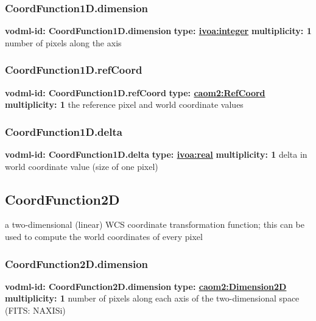     \subsubsection{CoordFunction1D.dimension}
      \textbf{vodml-id: CoordFunction1D.dimension} \newline
      \textbf{type: \hyperref[sect:ivoa]{ivoa:integer}} \newline
      \textbf{multiplicity: 1} \newline
      number of pixels along the axis

    \subsubsection{CoordFunction1D.refCoord}
      \textbf{vodml-id: CoordFunction1D.refCoord} \newline
      \textbf{type: \hyperref[sect:RefCoord]{caom2:RefCoord}} \newline
      \textbf{multiplicity: 1} \newline
      the reference pixel and world coordinate values

    \subsubsection{CoordFunction1D.delta}
      \textbf{vodml-id: CoordFunction1D.delta} \newline
      \textbf{type: \hyperref[sect:ivoa]{ivoa:real}} \newline
      \textbf{multiplicity: 1} \newline
      delta in world coordinate value (size of one pixel)

  \subsection{CoordFunction2D}
  \label{sect:CoordFunction2D}
    a two-dimensional (linear) WCS coordinate transformation function; this can be used to compute the world coordinates of every pixel

    \subsubsection{CoordFunction2D.dimension}
      \textbf{vodml-id: CoordFunction2D.dimension} \newline
      \textbf{type: \hyperref[sect:Dimension2D]{caom2:Dimension2D}} \newline
      \textbf{multiplicity: 1} \newline
      number of pixels along each axis of the two-dimensional space (FITS: NAXISi)

